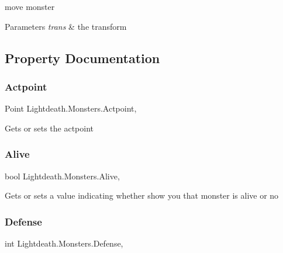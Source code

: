 move monster 


\begin{DoxyParams}{Parameters}
{\em trans} & the transform\\
\hline
\end{DoxyParams}


\subsection{Property Documentation}
\hypertarget{class_lightdeath_1_1_monsters_a387b8fec5906af5d857dc861340fc783}{}\label{class_lightdeath_1_1_monsters_a387b8fec5906af5d857dc861340fc783} 
\subsubsection{\texorpdfstring{Actpoint}{Actpoint}}
{\footnotesize\ttfamily Point Lightdeath.\+Monsters.\+Actpoint\hspace{0.3cm}{\ttfamily [get]}, {\ttfamily [set]}}



Gets or sets the actpoint 

\hypertarget{class_lightdeath_1_1_monsters_a0ba7cc244a302984a838cde8a112dd66}{}\label{class_lightdeath_1_1_monsters_a0ba7cc244a302984a838cde8a112dd66} 
\subsubsection{\texorpdfstring{Alive}{Alive}}
{\footnotesize\ttfamily bool Lightdeath.\+Monsters.\+Alive\hspace{0.3cm}{\ttfamily [get]}, {\ttfamily [set]}}



Gets or sets a value indicating whether show you that monster is alive or no 

\hypertarget{class_lightdeath_1_1_monsters_a540acb36e25a3138f744ede0c04c0477}{}\label{class_lightdeath_1_1_monsters_a540acb36e25a3138f744ede0c04c0477} 
\subsubsection{\texorpdfstring{Defense}{Defense}}
{\footnotesize\ttfamily int Lightdeath.\+Monsters.\+Defense\hspace{0.3cm}{\ttfamily [get]}, {\ttfamily [set]}}



